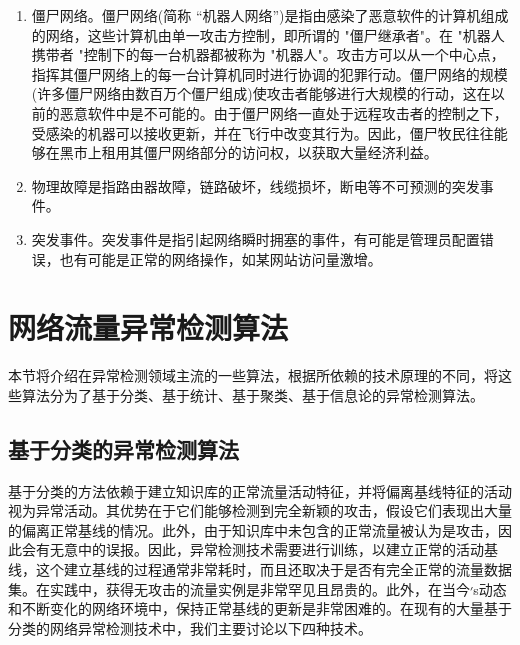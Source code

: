 \begin{enumerate}
    \item 僵尸网络。僵尸网络(简称 “机器人网络”)是指由感染了恶意软件的计算机组成的网络，这些计算机由单一攻击方控制，即所谓的 "僵尸继承者"。在 "机器人携带者 "控制下的每一台机器都被称为 "机器人"。攻击方可以从一个中心点，指挥其僵尸网络上的每一台计算机同时进行协调的犯罪行动。僵尸网络的规模(许多僵尸网络由数百万个僵尸组成)使攻击者能够进行大规模的行动，这在以前的恶意软件中是不可能的。由于僵尸网络一直处于远程攻击者的控制之下，受感染的机器可以接收更新，并在飞行中改变其行为。因此，僵尸牧民往往能够在黑市上租用其僵尸网络部分的访问权，以获取大量经济利益。
    
    \item 物理故障是指路由器故障，链路破坏，线缆损坏，断电等不可预测的突发事件。
    
    \item 突发事件。突发事件是指引起网络瞬时拥塞的事件，有可能是管理员配置错误，也有可能是正常的网络操作，如某网站访问量激增。
\end{enumerate}



\section{网络流量异常检测算法}


本节将介绍在异常检测领域主流的一些算法，根据所依赖的技术原理的不同，将这些算法分为了基于分类、基于统计、基于聚类、基于信息论的异常检测算法。

\subsection{基于分类的异常检测算法}


基于分类的方法依赖于建立知识库的正常流量活动特征，并将偏离基线特征的活动视为异常活动。其优势在于它们能够检测到完全新颖的攻击，假设它们表现出大量的偏离正常基线的情况。此外，由于知识库中未包含的正常流量被认为是攻击，因此会有无意中的误报。因此，异常检测技术需要进行训练，以建立正常的活动基线，这个建立基线的过程通常非常耗时，而且还取决于是否有完全正常的流量数据集。在实践中，获得无攻击的流量实例是非常罕见且昂贵的。此外，在当今׳s动态和不断变化的网络环境中，保持正常基线的更新是非常困难的。在现有的大量基于分类的网络异常检测技术中，我们主要讨论以下四种技术。

